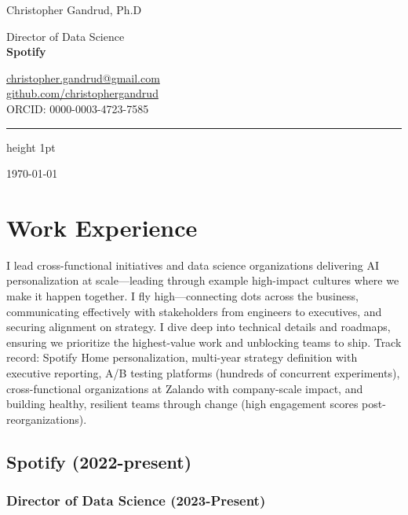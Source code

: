 \documentclass[a4paper]{article}
\begin{document}
\begin{flushright}
    {\huge Christopher Gandrud, Ph.D} \\
    \vspace{0.251cm}

    Director of Data Science \\
    {\bf{\large Spotify}} \\
    \vspace{0.25cm}

    \href{mailto:christopher.gandrud@gmail.com}{christopher.gandrud@gmail.com} \\
    \href{https://github.com/christophergandrud}{github.com/christophergandrud} \\
    ORCID: 0000-0003-4723-7585 \\
    \medskip\hrule height 1pt

    \vspace{0.5cm}
    \today
\end{flushright}

\vspace{0.5cm}

\section*{Work Experience}

\noindent I lead cross-functional initiatives and data science organizations delivering AI personalization at scale---leading through example high-impact cultures where we make it happen together. I fly high---connecting dots across the business, communicating effectively with stakeholders from engineers to executives, and securing alignment on strategy. I dive deep into technical details and roadmaps, ensuring we prioritize the highest-value work and unblocking teams to ship. Track record: Spotify Home personalization, multi-year strategy definition with executive reporting, A/B testing platforms (hundreds of concurrent experiments), cross-functional organizations at Zalando with company-scale impact, and building healthy, resilient teams through change (high engagement scores post-reorganizations).

\subsection*{Spotify (2022-present)}

\subsubsection*{Director of Data Science (2023-Present)}
\end{document}
